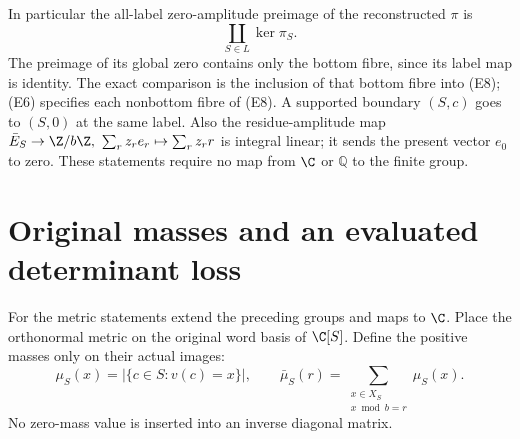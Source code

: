 In particular the all-label zero-amplitude preimage of the reconstructed
\(\pi\) is
\[
 \coprod_{S\in L}\ker\pi_S .
 \tag{E8}
\]
The preimage of its global zero contains only the bottom fibre, since its
label map is identity.  The exact comparison is the inclusion of that
bottom fibre into (E8); (E6) specifies each nonbottom fibre of (E8).
A supported boundary \((S,c)\) goes to \((S,0)\) at the same label.
Also the residue-amplitude map
\(\bar E_S\to\Z/b\Z,\ \sum_rz_re_r\mapsto\sum_rz_rr\) is integral linear;
it sends the present vector \(e_0\) to zero.  These statements require no
map from \(\C\) or \(\mathbb Q\) to the finite group.

\section{Original masses and an evaluated determinant loss}

For the metric statements extend the preceding groups and maps to \(\C\).
Place the orthonormal metric on the original word basis of \(\C[S]\).
Define the positive masses only on their actual images:
\[
 \mu_S(x)=|\{c\in S:v(c)=x\}|,\qquad
 \bar\mu_S(r)=\sum_{\substack{x\in X_S\\x\bmod b=r}}\mu_S(x).
 \tag{E9}
\]
No zero-mass value is inserted into an inverse diagonal matrix.

